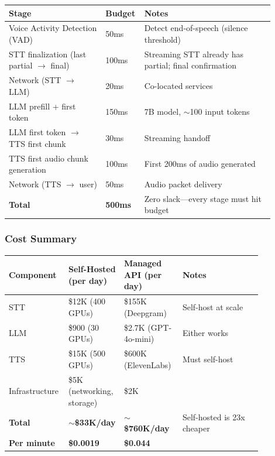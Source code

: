 \begin{tabular}{|p{0.35\linewidth}|p{0.08\linewidth}|p{0.47\linewidth}|}
\hline
\textbf{Stage} & \textbf{Budget} & \textbf{Notes} \\
\hline
Voice Activity Detection (VAD) & 50ms & Detect end-of-speech (silence threshold) \\
\hline
STT finalization (last partial $\rightarrow$ final) & 100ms & Streaming STT already has partial; final confirmation \\
\hline
Network (STT $\rightarrow$ LLM) & 20ms & Co-located services \\
\hline
LLM prefill + first token & 150ms & 7B model, $\sim$100 input tokens \\
\hline
LLM first token $\rightarrow$ TTS first chunk & 30ms & Streaming handoff \\
\hline
TTS first audio chunk generation & 100ms & First 200ms of audio generated \\
\hline
Network (TTS $\rightarrow$ user) & 50ms & Audio packet delivery \\
\hline
\textbf{Total} & \textbf{500ms} & Zero slack---every stage must hit budget \\
\hline
\end{tabular}

\subsubsection*{Cost Summary}

\begin{tabular}{|p{0.14\linewidth}|p{0.2\linewidth}|p{0.22\linewidth}|p{0.3\linewidth}|}
\hline
\textbf{Component} & \textbf{Self-Hosted (per day)} & \textbf{Managed API (per day)} & \textbf{Notes} \\
\hline
STT & \$12K (400 GPUs) & \$155K (Deepgram) & Self-host at scale \\
\hline
LLM & \$900 (30 GPUs) & \$2.7K (GPT-4o-mini) & Either works \\
\hline
TTS & \$15K (500 GPUs) & \$600K (ElevenLabs) & Must self-host \\
\hline
Infrastructure & \$5K (networking, storage) & \$2K & \\
\hline
\textbf{Total} & \textbf{$\sim$\$33K/day} & \textbf{$\sim$\$760K/day} & Self-hosted is 23x cheaper \\
\hline
\textbf{Per minute} & \textbf{\$0.0019} & \textbf{\$0.044} & \\
\hline
\end{tabular}


